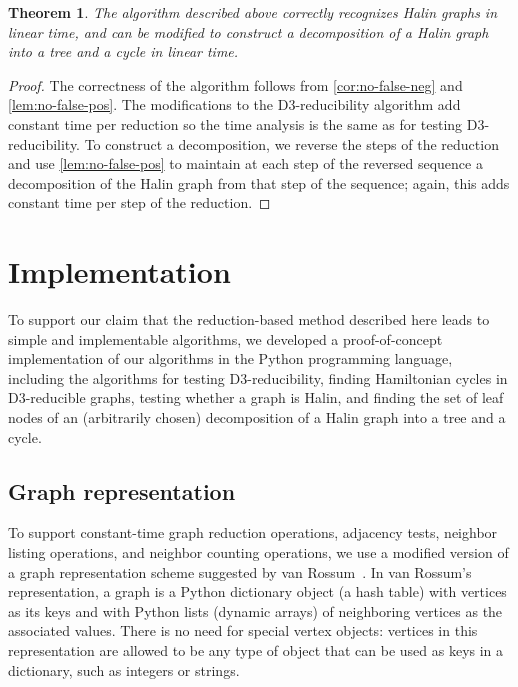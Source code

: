 \documentclass{article}
\newtheorem{theorem}{Theorem}
\begin{document}
\begin{theorem}
The algorithm described above correctly recognizes Halin graphs in linear time,
and can be modified to construct a decomposition of a Halin graph into a tree and a cycle in linear time.
\end{theorem}

\begin{proof}
The correctness of the algorithm follows from \autoref{cor:no-false-neg} and \autoref{lem:no-false-pos}. The modifications to the D3-reducibility algorithm add constant time per reduction so the time analysis is the same as for testing D3-reducibility. To construct a decomposition, we reverse the steps of the reduction and use \autoref{lem:no-false-pos} to maintain at each step of the reversed sequence a decomposition of the Halin graph from that step of the sequence; again, this adds constant time per step of the reduction.
\end{proof}

\section{Implementation}

To support our claim that the reduction-based method described here leads to simple and implementable algorithms, we developed a proof-of-concept implementation of our algorithms in the Python programming language, including the algorithms for testing D3-reducibility, finding Hamiltonian cycles in D3-reducible graphs, testing whether a graph is Halin, and finding the set of leaf nodes of an (arbitrarily chosen) decomposition of a Halin graph into a tree and a cycle.

\subsection{Graph representation}

To support constant-time graph reduction operations, adjacency tests, neighbor listing operations, and neighbor counting operations, we use a modified version of a graph representation scheme suggested by van Rossum~\cite{Ros-PP-98}. In van Rossum's representation, a graph is a Python dictionary object (a hash table) with vertices as its keys and with Python lists (dynamic arrays) of neighboring vertices as the associated values. There is no need for special vertex objects: vertices in this representation are allowed to be any type of object that can be used as keys in a dictionary, such as integers or strings.
\end{document}
